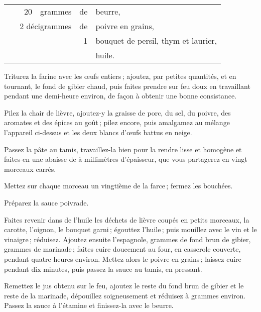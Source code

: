 \begin{longtable}{rrrrrp{18em}}
  & \hspace{2em} &  20 & grammes & de & beurre,                                                           \\
  & \multicolumn{3}{r}{2 décigrammes} & de & poivre en grains,                                            \\
  & \hspace{2em} &     &         &  1 & bouquet de persil, thym et laurier,                               \\
  & \hspace{2em} &     &         &    & huile.                                                            \\
\end{longtable}
\normalsize

Triturez la farine avec les œufs entiers ; ajoutez, par petites quantités, et en
tournant, le fond de gibier chaud, puis faites prendre sur feu doux en travaillant
pendant une demi-heure environ, de façon à obtenir une bonne consistance.

Pilez la chair de lièvre, ajoutez-y la graisse de porc, du sel, du poivre, des
aromates et des épices au goût ; pilez encore, puis amalgamez au mélange
l'appareil ci-dessus et les deux blancs d'œufs battus en neige.

Passez la pâte au tamis, travaillez-la bien pour la rendre lisse et homogène et
faites-en une abaisse de {\mmm} à {\mmm} millimètres d'épaisseur, que vous partagerez en
vingt morceaux carrés.

Mettez sur chaque morceau un vingtième de la farce ; fermez les bouchées.

Préparez la sauce poivrade.

Faites revenir dans de l'huile les déchets de lièvre coupés en petits morceaux,
la carotte, l'oignon, le bouquet garni ; égouttez l'huile ; puis mouillez avec
le vin et le vinaigre ; réduisez. Ajoutez ensuite l'espagnole, {\mmm}
grammes de fond brun de gibier, {\mmm} grammes de marinade ; faites
cuire doucement au four, en casserole couverte, pendant quatre heures environ.
Mettez alors le poivre en grains ; laissez cuire pendant dix minutes, puis
passez la sauce au tamis, en pressant.

Remettez le jus obtenu sur le feu, ajoutez le reste du fond brun de gibier et
le reste de la marinade, dépouillez soigneusement et réduisez à {\mmm}
grammes environ. Passez la sauce à l'étamine et finissez-la avec le beurre.

